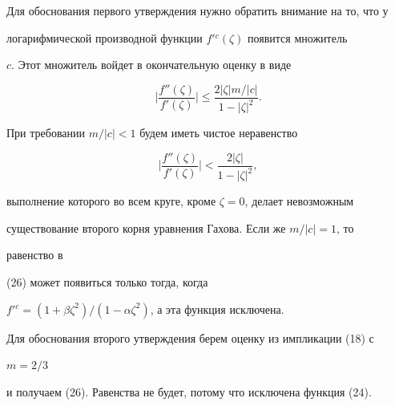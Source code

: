 \begin{pf}


Для обоснования первого утверждения нужно обратить внимание на то, что у


логарифмической производной функции $f'{}^c(\zeta)$ появится множитель


$c$. Этот множитель войдет в окончательную оценку в виде


\begin{equation}


\biggl|\frac{f''(\zeta)}{f'(\zeta)}\biggr|\le


\frac{2|\zeta|m/|c|}{1-|\zeta|^2}.


\end{equation}


При требовании $m/|c|<1$ будем иметь чистое неравенство


\begin{equation}


\biggl|\frac{f''(\zeta)}{f'(\zeta)}\biggr|<


\frac{2|\zeta|}{1-|\zeta|^2},


\end{equation}


выполнение которого во всем круге, кроме $\zeta=0$, делает невозможным


существование второго корня уравнения Гахова. Если же $m/|c|=1$, то


равенство в


(26) может появиться только тогда, когда


$f'{}^c=(1+\beta\zeta^2)/(1-\alpha\zeta^2)$, а эта функция исключена.





Для обоснования второго утверждения берем оценку из импликации (18) с


$m=2/3$


и получаем (26). Равенства не будет, потому что исключена функция (24).


\end{pf}





